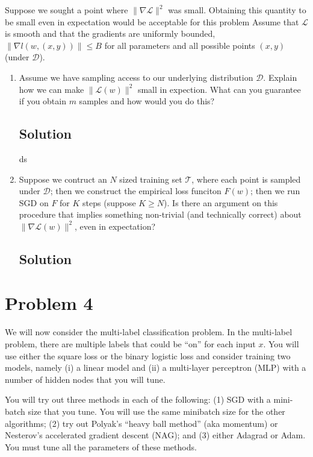 \documentclass[letterpaper,11pt]{article}
\begin{document}
Suppose we sought a point where $\lVert \nabla \mathcal{L} \rVert^2$ was
small. Obtaining this quantity to be small even in expectation would be
acceptable for this problem Assume that $\mathcal{L}$ is smooth and that the
gradients are uniformly bounded,
$\lVert \nabla l\left(w, (x,y)\right)\rVert \leq B$ for all parameters and all
possible points $(x,y)$ (under $\mathcal{D}$).

\begin{enumerate}
\item 
  Assume we have sampling access to our underlying distribution
  $\mathcal{D}$. Explain how we can make $\lVert \mathcal{L}(w) \rVert^2$ small
  in expection. What can you guarantee if you obtain $m$ samples and how would
  you do this?

  \subsection*{Solution}
  ds

\item Suppose we contruct an $N$ sized training set $\mathcal{T}$, where each
  point is sampled under $\mathcal{D}$; then we construct the empirical loss
  funciton $F(w)$; then we run SGD on $F$ for $K$ steps (suppose $K \geq N$). Is
  there an argument on this procedure that implies something non-trivial (and
  technically correct) about $\lVert \nabla\mathcal{L}(w)\rVert^2$, even in
  expectation?

  \subsection*{Solution}
\end{enumerate}

\section*{Problem 4}

We will now consider the multi-label classification problem. In the multi-label
problem, there are multiple labels that could be ``on'' for each input $x$. You
will use either the square loss or the binary logistic loss and consider
training two models, namely (i) a linear model and (ii) a multi-layer perceptron
(MLP) with a number of hidden nodes that you will tune.

You will try out three methods in each of the following: (1) SGD with a
mini-batch size that you tune. You will use the same minibatch size for the
other algorithms; (2) try out Polyak’s ``heavy ball method'' (aka momentum) or
Nesterov’s accelerated gradient descent (NAG); and (3) either Adagrad or
Adam. You must tune all the parameters of these methods.
\end{document}
